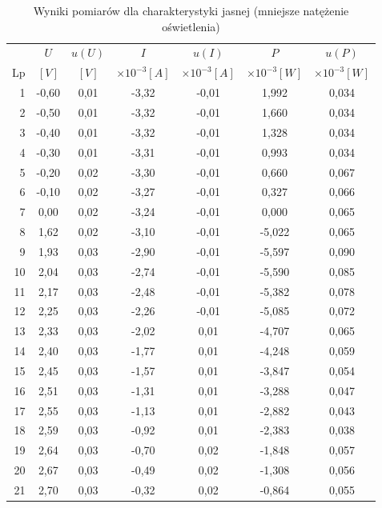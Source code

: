 \documentclass[polish, 11pt, a4paper]{article}
\begin{document}
		\begin{table}[H]
			\centering
			\caption{Wyniki pomiarów dla charakterystyki jasnej (mniejsze natężenie oświetlenia)}
			\begin{tabular}{|r|c|c|c|c|c|c|}\hline
					&	\(U\)	&	\(u(U)\)	&	\(I\)	&	\(u(I)\)	&	\(P\)	&	\(u(P)\)	\\
				Lp	&	\([V]\)	&	\([V]\)	&	\(\times10^{-3} [A]\)	&	\(\times10^{-3} [A]\)	&	\(\times10^{-3} [W]\)	&	\(\times10^{-3} [W]\)	\\\hline
				1	&	-0,60	&	0,01	&	-3,32	&	-0,01	&	1,992	&	0,034	\\\hline
				2	&	-0,50	&	0,01	&	-3,32	&	-0,01	&	1,660	&	0,034	\\\hline
				3	&	-0,40	&	0,01	&	-3,32	&	-0,01	&	1,328	&	0,034	\\\hline
				4	&	-0,30	&	0,01	&	-3,31	&	-0,01	&	0,993	&	0,034	\\\hline
				5	&	-0,20	&	0,02	&	-3,30	&	-0,01	&	0,660	&	0,067	\\\hline
				6	&	-0,10	&	0,02	&	-3,27	&	-0,01	&	0,327	&	0,066	\\\hline
				7	&	0,00	&	0,02	&	-3,24	&	-0,01	&	0,000	&	0,065	\\\hline
				8	&	1,62	&	0,02	&	-3,10	&	-0,01	&	-5,022	&	0,065	\\\hline
				9	&	1,93	&	0,03	&	-2,90	&	-0,01	&	-5,597	&	0,090	\\\hline
				10	&	2,04	&	0,03	&	-2,74	&	-0,01	&	-5,590	&	0,085	\\\hline
				11	&	2,17	&	0,03	&	-2,48	&	-0,01	&	-5,382	&	0,078	\\\hline
				12	&	2,25	&	0,03	&	-2,26	&	-0,01	&	-5,085	&	0,072	\\\hline
				13	&	2,33	&	0,03	&	-2,02	&	0,01	&	-4,707	&	0,065	\\\hline
				14	&	2,40	&	0,03	&	-1,77	&	0,01	&	-4,248	&	0,059	\\\hline
				15	&	2,45	&	0,03	&	-1,57	&	0,01	&	-3,847	&	0,054	\\\hline
				16	&	2,51	&	0,03	&	-1,31	&	0,01	&	-3,288	&	0,047	\\\hline
				17	&	2,55	&	0,03	&	-1,13	&	0,01	&	-2,882	&	0,043	\\\hline
				18	&	2,59	&	0,03	&	-0,92	&	0,01	&	-2,383	&	0,038	\\\hline
				19	&	2,64	&	0,03	&	-0,70	&	0,02	&	-1,848	&	0,057	\\\hline
				20	&	2,67	&	0,03	&	-0,49	&	0,02	&	-1,308	&	0,056	\\\hline
				21	&	2,70	&	0,03	&	-0,32	&	0,02	&	-0,864	&	0,055	\\\hline

\end{tabular}
\end{table}
\end{document}
